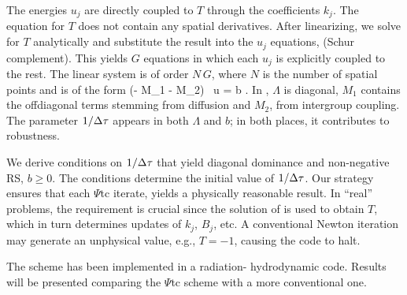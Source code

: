 \documentclass{report}
\begin{document}
The energies $u_j$ are directly coupled to $T$
through the coefficients $k_j$.
The equation for $T$ does not contain any spatial derivatives.
After linearizing, we solve for $T$ analytically and
substitute the result into the $u_j$ equations,
(Schur complement). This yields $G$
equations in which each $u_j$ is explicitly
coupled to the rest. The linear system is of
order $N \, G$, where $N$ is the number of spatial
points and is of the form
\be
(\Lambda - M_1 - M_2) \, u = b \; . \label{linsys}
\ee
In ,
$\Lambda$ is diagonal, $M_1$ contains the offdiagonal terms
stemming from diffusion and $M_2$, from
intergroup coupling. The parameter $1/\Delta \tau$
appears in both $\Lambda$ and $b$; in both places, it contributes
to robustness.

We derive conditions on $1/\Delta \tau$ that yield
diagonal dominance and non-negative RS, $b \ge 0$.
The conditions determine the initial value of $1/\Delta \tau$.
Our strategy ensures that each $\Psi$tc iterate,
yields a physically reasonable result.
In ``real'' problems, the requirement is crucial since the
solution of  is used to obtain $T$, which
in turn determines updates of $k_j$, $B_j$, etc.
A conventional Newton iteration may generate an unphysical
value, e.g., $T = -1$, causing the code to halt.

The scheme has been implemented in a radiation-
hydrodynamic code. Results will be presented comparing
the $\Psi$tc scheme with a more conventional one.
\end{document}
